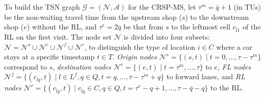 \documentclass[12pt]{article}
\begin{document}
To build the TSN graph $\mathcal{G}=(\mathcal{N},\mathcal{A})$ for the CRSP-MS, let $\tau^m=\bar{q}+1$ (in TUs) be the non-waiting travel time from the upstream shop ($s$) to the downstream shop ($e$) without the RL, and $\tau^r=2\bar{q}$ be that from $s$ to the leftmost cell $c_{\bar{l}1}$ of the RL on the first visit. The node set $\mathcal{N}$ is divided into four subsets: $\mathcal{N}=\mathcal{N}^{s}\cup \mathcal{N}^e\cup \mathcal{N}^{f}\cup \mathcal{N}^{r}$, to distinguish the type of location $i\in C$ where a car stays at a specific timestamp $t\in T$. \textit{Origin nodes} $\mathcal{N}^s=\{(s,t)\mid t=0,\dots,\tau-\tau^m\}$ correspond to $s$, \textit{destination nodes} $\mathcal{N}^e=\{(e,t)\mid t=\tau^m,\dots,\tau\}$ to $e$, \textit{FL nodes} $\mathcal{N}^{f}=\{(c_{lq},t)\mid l\in L^f,q\in Q,t=q,\dots,\tau-\tau^m+q\}$ to forward lanes, and \textit{RL nodes} $\mathcal{N}^r=\{(c_{\bar{l}q},t)\mid c_{\bar{l}q}\in C, q\in Q, t=\tau^r-q+1,\dots,\tau-\bar{q}-q\}$ to the RL.








\end{document}

